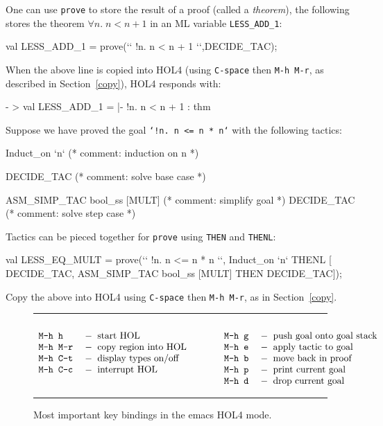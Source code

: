 \documentclass[a4paper,10pt]{article}
\begin{document}
One can use {\tt prove} to store the result of a proof (called a
\emph{theorem}), \eg{} the following stores the theorem $\forall n.\;n < n +
1$ in an ML variable {\tt LESS\_ADD\_1}:
\begin{code}
val LESS_ADD_1 = prove({`}` !n. n < n + 1 {`}`,DECIDE_TAC);
\end{code}
When the above line is copied into HOL4 (using {\tt C-space} then
{\tt M-h M-r}, as described in Section~\ref{copy}), HOL4 responds with:
\begin{code}
- > val LESS_ADD_1 = |- !n. n < n + 1 : thm
\end{code}


Suppose we have proved the goal {\tt `!n{.}~n <= n * n`} with the following tactics:
\begin{code}
Induct_on `n`                   (* comment: induction on n  *)

  DECIDE_TAC                    (* comment: solve base case *)

  ASM_SIMP_TAC bool_ss [MULT]   (* comment: simplify goal   *)
  DECIDE_TAC                    (* comment: solve step case *)
\end{code}
Tactics can be pieced together for {\tt prove} using {\tt THEN} and {\tt THENL}:
\begin{code}
val LESS_EQ_MULT = prove({`}` !n. n <= n * n {`}`,
  Induct_on `n` THENL [
    DECIDE_TAC,
    ASM_SIMP_TAC bool_ss [MULT] THEN
    DECIDE_TAC]);
\end{code}
Copy the above into HOL4 using {\tt C-space} then
{\tt M-h M-r}, as in Section~\ref{copy}.

\newcommand{\itemz}[2]{\texttt{#1}\; &-\;\; \textrm{#2}}
\newcommand{\itemy}[2]{#1&\quad\quad&#2\\}

\begin{figure}[t]
\hrule

\begin{displaymath}
\begin{array}{lllll}
\itemy{\itemz{\rule{0em}{1.5em}M-h h}{start HOL}}{\itemz{M-h g}{push goal onto goal stack}}
\itemy{\itemz{M-h M-r}{copy region into HOL}}{\itemz{M-h e}{apply tactic to goal}}
\itemy{\itemz{M-h C-t}{display types on/off}}{\itemz{M-h b}{move back in proof}}
\itemy{\itemz{M-h C-c}{interrupt HOL}}{\itemz{M-h p}{print current goal}}
\itemy{&}{\itemz{M-h d}{drop current goal}}
\end{array}
\end{displaymath}
\caption{Most important key bindings in the emacs HOL4 mode.}

\rule{0em}{1.5em}\hrule
\end{figure}
\end{document}
